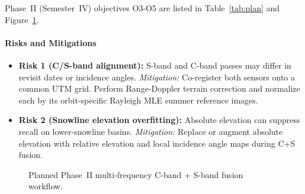 \documentclass{article}
\newif\ifshowguide
\newcommand{\guide}[1]{%
  \ifshowguide
    \par\medskip\noindent
    \fcolorbox{blue!50}{blue!4}{%
      \begin{minipage}{\dimexpr\linewidth-2\fboxsep-2\fboxrule\relax}
        \small\color{blue!55!black}\textbf{Guidance.} #1
      \end{minipage}}%
    \par\medskip
  \fi}
\begin{document}
\guide{About half to one page. Give a concrete, dated plan linked to the
objectives in Table~\ref{tab:objectives}. Each milestone should have a clear
deliverable. Also list the main risks (e.g., data access, compute, a method not
working) and your fallback for each. The Phase~II evaluation will check
progress against this plan.}

Phase~II (Semester~IV) objectives O3-O5 are listed in Table~\ref{tab:plan} and Figure~\ref{fig:phase2_fusion}.

\paragraph{Risks and Mitigations}
\begin{itemize}\setlength{\itemsep}{1pt}\setlength{\parskip}{0pt}
  \item \textbf{Risk 1 (C/S-band alignment):} S-band and C-band passes may differ in revisit dates or incidence angles. \emph{Mitigation:} Co-register both sensors onto a common UTM grid. Perform Range-Doppler terrain correction and normalize each by its orbit-specific Rayleigh MLE summer reference images.
  \item \textbf{Risk 2 (Snowline elevation overfitting):} Absolute elevation can suppress recall on lower-snowline basins. \emph{Mitigation:} Replace or augment absolute elevation with relative elevation and local incidence angle maps during C+S fusion.
\end{itemize}

\begin{figure}[!htb]
  \centering
  \vspace{10pt}
  \caption{Planned Phase~II multi-frequency C-band + S-band fusion workflow.}
  \label{fig:phase2_fusion}
  \vspace{-6pt}
\end{figure}
\end{document}
